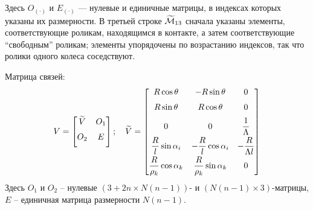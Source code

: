 Здесь $O_{(\boldsymbol{\cdot})}$ и $E_{(\boldsymbol{\cdot})}$ --- нулевые и единичные матрицы, в индексах которых указаны их размерности. В третьей строке $\widetilde{\mathcal{M}}_{13}$ сначала указаны элементы, соответствующие роликам, находящимся в контакте, а затем соответствующие ``свободным'' роликам; элементы упорядочены по возрастанию индексов, так что ролики одного колеса соседствуют.

Матрица связей:
$$
V = \begin{bmatrix}
        \widetilde{V}  & O_1  \\[6pt]
        O_2       & E         \\[6pt]
    \end{bmatrix};
\quad
\widetilde{V} = \begin{bmatrix}
        R\cos\theta                    & -R\sin\theta                    & 0                      \\[6pt]
        R\sin\theta                    &  R\cos\theta                    & 0                      \\[6pt]
        0                              & 0                               & \displaystyle\frac{\displaystyle 1}{\displaystyle \Lambda}    \\[6pt]
        \displaystyle\frac{\displaystyle R}{\displaystyle l}\sin\alpha_i      & -\displaystyle\frac{\displaystyle R}{\displaystyle l}\cos\alpha_i      & -\displaystyle\frac{\displaystyle R}{\displaystyle \Lambda l} \\[6pt]
        \displaystyle\frac{\displaystyle R}{\displaystyle \rho_k}\cos\alpha_k &  \displaystyle\frac{\displaystyle R}{\displaystyle \rho_k}\sin\alpha_k & 0                      \\[6pt]
    \end{bmatrix}
$$
Здесь $O_1$ и $O_2$ -- нулевые $(3+2n \times N(n-1))$- и $(N(n-1) \times 3)$-матрицы, $E$ -- единичная матрица размерности $N(n-1)$.

